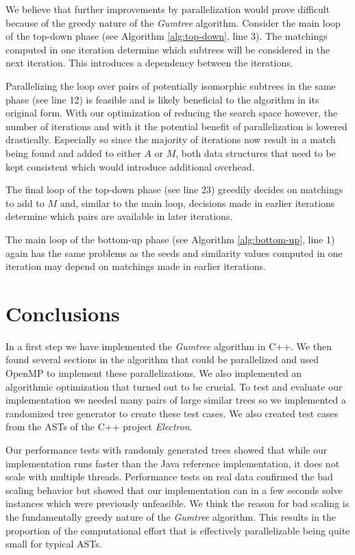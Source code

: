 \documentclass[letterpaper]{article}
\begin{document}
We believe that further improvements by parallelization would prove difficult because of the greedy nature of the \emph{Gumtree} algorithm.
Consider the main loop of the top-down phase (see Algorithm \ref{alg:top-down}, line 3).
The matchings computed in one iteration determine which subtrees will be considered in the next iteration.
This introduces a dependency between the iterations.

Parallelizing the loop over pairs of potentially isomorphic subtrees in the same phase (see line 12) is feasible and is likely beneficial to the algorithm in its original form.
With our optimization of reducing the search space however, the number of iterations and with it the potential benefit of parallelization is lowered drastically.
Especially so since the majority of iterations now result in a match being found and added to either $A$ or $M$, both data structures that need to be kept consistent which would introduce additional overhead.

The final loop of the top-down phase (see line 23) greedily decides on matchings to add to $M$ and, similar to the main loop, decisions made in earlier iterations determine which pairs are available in later iterations.

The main loop of the bottom-up phase (see Algorithm \ref{alg:bottom-up}, line 1) again has the same problems as the seeds and similarity values computed in one iteration may depend on matchings made in earlier iterations.

\section{Conclusions}

In a first step we have implemented the \emph{Gumtree} algorithm in C++.
We then found several sections in the algorithm that could be parallelized and used OpenMP to implement these parallelizations.
We also implemented an algorithmic optimization that turned out to be crucial.
To test and evaluate our implementation we needed many pairs of large similar trees so we implemented a randomized tree generator to create these test cases.
We also created test cases from the ASTs of the C++ project \emph{Electron}.

Our performance tests with randomly generated trees showed that while our implementation runs faster than the Java reference implementation, it does not scale with multiple threads.
Performance tests on real data confirmed the bad scaling behavior but showed that our implementation can in a few seconds solve instances which were previously unfeasible.
We think the reason for bad scaling is the fundamentally greedy nature of the \emph{Gumtree} algorithm.
This results in the proportion of the computational effort that is effectively parallelizable being quite small for typical ASTs.
\end{document}
